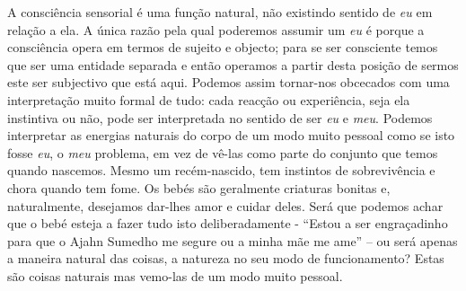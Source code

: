 A consciência sensorial é uma função natural, não existindo sentido de
\emph{eu} em relação a ela. A única razão pela qual poderemos assumir um
\emph{eu} é porque a consciência opera em termos de sujeito e objecto;
para se ser consciente temos que ser uma entidade separada e então
operamos a partir desta posição de sermos este ser subjectivo que está
aqui. Podemos assim tornar-nos obcecados com uma interpretação muito
formal de tudo: cada reacção ou experiência, seja ela instintiva ou não,
pode ser interpretada no sentido de ser \emph{eu} e \emph{meu}. Podemos
interpretar as energias naturais do corpo de um modo muito pessoal como
se isto fosse \emph{eu}, o \emph{meu} problema, em vez de vê-las como
parte do conjunto que temos quando nascemos. Mesmo um recém-nascido, tem
instintos de sobrevivência e chora quando tem fome. Os bebés são
geralmente criaturas bonitas e, naturalmente, desejamos dar-lhes amor e
cuidar deles. Será que podemos achar que o bebé esteja a fazer tudo isto
deliberadamente - ``Estou a ser engraçadinho para que o Ajahn Sumedho me
segure ou a minha mãe me ame'' -- ou será apenas a maneira natural das
coisas, a natureza no seu modo de funcionamento? Estas são coisas
naturais mas vemo-las de um modo muito pessoal.


